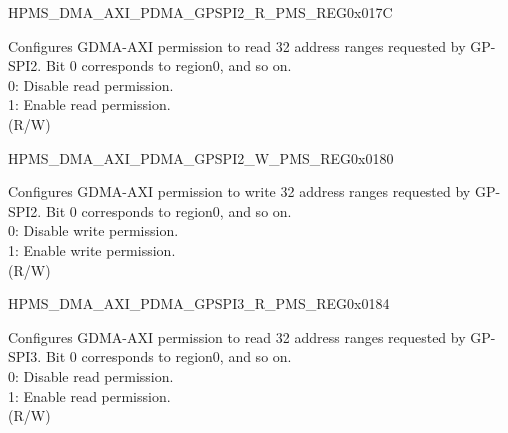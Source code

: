 \begin{register}{H}{PMS\_DMA\_AXI\_PDMA\_GPSPI2\_R\_PMS\_REG}{0x017C}\label{regdesc:PMSDMAAXIPDMAGPSPI2RPMSREG}
%
\regnewline%
\begin{regdesc}\begin{reglist}
\label{fielddesc:PMSDMAAXIPDMAGPSPI2RPMS}\item [PMS\_DMA\_AXI\_PDMA\_GPSPI2\_R\_PMS] Configures GDMA-AXI permission to read 32 address ranges requested by GP-SPI2. Bit 0 corresponds to region0, and so on.\\
0: Disable read permission.\\
1: Enable read permission.\\ (R/W)
\end{reglist}\end{regdesc}
\end{register}


\begin{register}{H}{PMS\_DMA\_AXI\_PDMA\_GPSPI2\_W\_PMS\_REG}{0x0180}\label{regdesc:PMSDMAAXIPDMAGPSPI2WPMSREG}
%
\regnewline%
\begin{regdesc}\begin{reglist}
\label{fielddesc:PMSDMAAXIPDMAGPSPI2WPMS}\item [PMS\_DMA\_AXI\_PDMA\_GPSPI2\_W\_PMS] Configures GDMA-AXI permission to write 32 address ranges requested by GP-SPI2. Bit 0 corresponds to region0, and so on.\\
0: Disable write permission.\\
1: Enable write permission.\\ (R/W)
\end{reglist}\end{regdesc}
\end{register}


\begin{register}{H}{PMS\_DMA\_AXI\_PDMA\_GPSPI3\_R\_PMS\_REG}{0x0184}\label{regdesc:PMSDMAAXIPDMAGPSPI3RPMSREG}
%
\regnewline%
\begin{regdesc}\begin{reglist}
\label{fielddesc:PMSDMAAXIPDMAGPSPI3RPMS}\item [PMS\_DMA\_AXI\_PDMA\_GPSPI3\_R\_PMS] Configures GDMA-AXI permission to read 32 address ranges requested by GP-SPI3. Bit 0 corresponds to region0, and so on.\\
0: Disable read permission.\\
1: Enable read permission.\\ (R/W)
\end{reglist}\end{regdesc}
\end{register}


